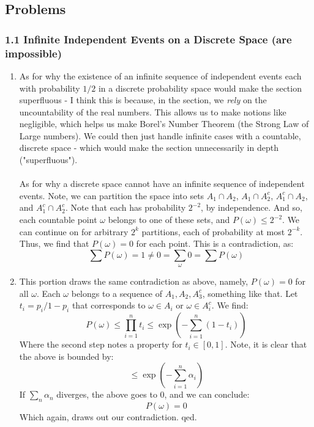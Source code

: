 \documentclass[12pt,a4paper]{article}
\newcommand{\1}[1]{\mathbbm{1}\left\{ #1 \right\}}
\begin{document}
\subsection{Problems}
\subsubsection{1.1 Infinite Independent Events on a Discrete Space (are impossible)} 
\begin{enumerate}
	\item As for why the existence of an infinite sequence of independent events each with probability $1/2$ in a discrete probability space would make the section superfluous - I think this is because, in the section, we \textit{rely} on the uncountability of the real numbers. This allows us to make notions like negligible, which helps us make Borel's Number Theorem (the Strong Law of Large numbers). We could then just handle infinite cases with a countable, discrete space - which would make the section unnecessarily in depth ("superfluous").
	\\\\
	As for why a discrete space cannot have an infinite sequence of independent events. Note, we can partition the space into sets $A_1 \cap A_2$, $A_1 \cap A_2^c$, $A_1^c \cap A_2$, and $A_1^c \cap A_2^c$. Note that each has probability $2^{-2}$, by independence. And so, each countable point $\omega$ belongs to one of these sets, and $P(\omega) \leq 2^{-2}$. We can continue on for arbitrary $2^k$ partitions, each of probability at most $2^{-k}$. Thus, we find that $P(\omega) = 0$ for each point. This is a contradiction, as:
	$$
		\sum P(\omega) = 1 \neq 0 = \sum_\omega 0 = \sum P(\omega)
	$$
	
	\item This portion draws the same contradiction as above, namely, $P(\omega) = 0$ for all $\omega$. Each $\omega$ belongs to a sequence of $A_1, A_2, A_3^c$, something like that. Let $t_i = p_i/1-p_i$ that corresponds to $\omega \in A_i$ or $\omega \in A_i^c$. We find:
	$$
		P(\omega) \leq \prod_{i=1}^n t_i \leq \exp\left(-\sum_{i=1}^n (1-t_i)\right)
	$$
	Where the second step notes a property for $t_i \in [0,1]$. Note, it is clear that the above is bounded by:
	$$
		\leq \exp\left(-\sum_{i=1}^n \alpha_i\right)
	$$
	If $\sum_n \alpha_n$ diverges, the above goes to $0$, and we can conclude:
	$$
		P(\omega) = 0
	$$
	Which again, draws out our contradiction. qed.
\end{enumerate}
\end{document}

